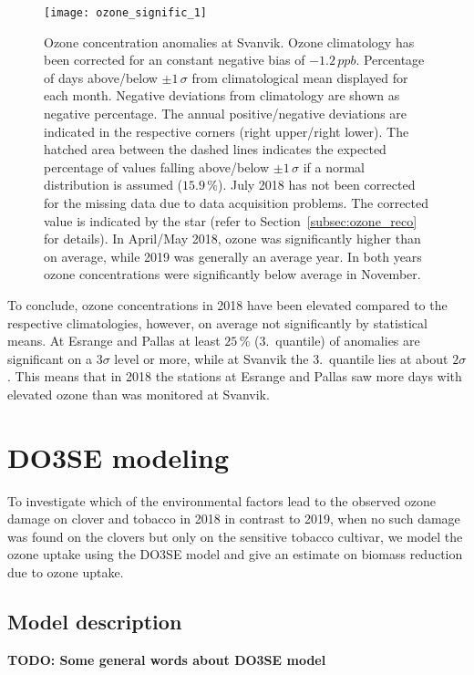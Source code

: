 \documentclass[bg, manuscript]{copernicus}
\begin{document}
\begin{figure}[t]
  \texttt{[image: ozone\_signific\_1]}
  \caption{Ozone concentration anomalies at Svanvik. Ozone climatology has been corrected for an constant negative bias of $-1.2\,\unit{ppb}$. Percentage of days above/below $\pm 1\,\sigma$ from climatological mean displayed for each month. Negative deviations from climatology are shown as negative percentage. The annual positive/negative deviations are indicated in the respective corners (right upper/right lower). The hatched area between the dashed lines indicates the expected percentage of values falling above/below $\pm 1\,\sigma$ if a normal distribution is assumed ($15.9\,\unit{\%}$). July 2018 has not been corrected for the missing data due to data acquisition problems. The corrected value is indicated by the star (refer to Section~\ref{subsec:ozone_reco} for details). In April/May 2018, ozone was significantly higher than on average, while 2019 was generally an average year. In both years ozone concentrations were significantly below average in November.}
  \label{fig:ozone_signific}
\end{figure}

To conclude, ozone concentrations in 2018 have been elevated compared to the respective climatologies, however, on average not significantly by statistical means. At Esrange and Pallas at least $25\,\unit{\%}$ (3.~quantile) of anomalies are significant on a $3\sigma$ level or more, while at Svanvik the 3.~quantile lies at about $2\sigma$. This means that in 2018 the stations at Esrange and Pallas saw more days with elevated ozone than was monitored at Svanvik.

\section{DO3SE modeling}
\label{sec:do3se}
To investigate which of the environmental factors lead to the observed ozone damage on clover and tobacco in 2018 in contrast to 2019, when no such damage was found on the clovers but only on the sensitive tobacco cultivar, we model the ozone uptake using the DO3SE model and give an estimate on biomass reduction due to ozone uptake.

\subsection{Model description}

{\bf TODO: Some general words about DO3SE model}
\end{document}
